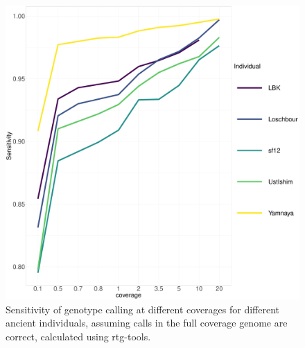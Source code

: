\begin{figure}[htp]
    \centering
    \includegraphics[width=1.0\textwidth]{../images/chapter1/allDownsampled_rtgtools_sensitivity.pdf}
    \caption{Sensitivity of genotype calling at different coverages for different ancient individuals, assuming calls in the full coverage genome are correct,  calculated using rtg-tools.}
    \label{fig:Sensitivity_downsampled_rtgtools}
\end{figure}

